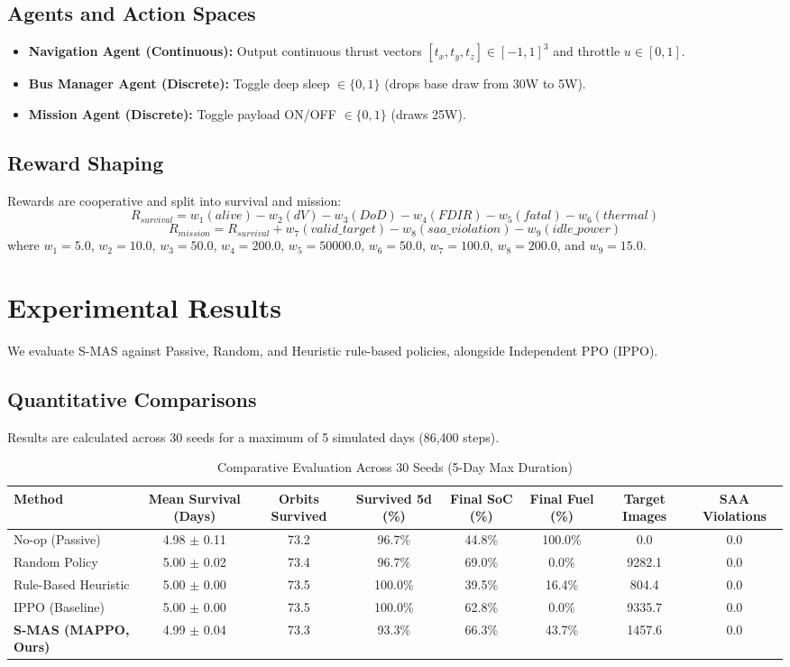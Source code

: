 \documentclass[conference]{IEEEtran}
\begin{document}
\subsection{Agents and Action Spaces}
\begin{itemize}
    \item \textbf{Navigation Agent (Continuous):} Output continuous thrust vectors $[t_x, t_y, t_z] \in [-1,1]^3$ and throttle $u \in [0,1]$.
    \item \textbf{Bus Manager Agent (Discrete):} Toggle deep sleep $\in \{0, 1\}$ (drops base draw from 30W to 5W).
    \item \textbf{Mission Agent (Discrete):} Toggle payload ON/OFF $\in \{0, 1\}$ (draws 25W).
\end{itemize}

\subsection{Reward Shaping}
Rewards are cooperative and split into survival and mission:
$$ R_{survival} = w_1(alive) - w_2(dV) - w_3(DoD) - w_4(FDIR) - w_5(fatal) - w_6(thermal) $$
$$ R_{mission} = R_{survival} + w_7(valid\_target) - w_8(saa\_violation) - w_9(idle\_power) $$
where $w_1=5.0$, $w_2=10.0$, $w_3=50.0$, $w_4=200.0$, $w_5=50000.0$, $w_6=50.0$, $w_7=100.0$, $w_8=200.0$, and $w_9=15.0$.

\section{Experimental Results}
We evaluate S-MAS against Passive, Random, and Heuristic rule-based policies, alongside Independent PPO (IPPO). 

\subsection{Quantitative Comparisons}
Results are calculated across 30 seeds for a maximum of 5 simulated days (86,400 steps).
\begin{table}[htbp]
\caption{Comparative Evaluation Across 30 Seeds (5-Day Max Duration)}
\label{tab:baselines}
\centering
\begin{tabular}{lccccccc}
\toprule
Method & Mean Survival (Days) & Orbits Survived & Survived 5d (\%) & Final SoC (\%) & Final Fuel (\%) & Target Images & SAA Violations \\
\midrule
No-op (Passive) & 4.98 $\pm$ 0.11 & 73.2 & 96.7\% & 44.8\% & 100.0\% & 0.0 & 0.0 \\
Random Policy & 5.00 $\pm$ 0.02 & 73.4 & 96.7\% & 69.0\% & 0.0\% & 9282.1 & 0.0 \\
Rule-Based Heuristic & 5.00 $\pm$ 0.00 & 73.5 & 100.0\% & 39.5\% & 16.4\% & 804.4 & 0.0 \\
IPPO (Baseline) & 5.00 $\pm$ 0.00 & 73.5 & 100.0\% & 62.8\% & 0.0\% & 9335.7 & 0.0 \\
\textbf{S-MAS (MAPPO, Ours)} & 4.99 $\pm$ 0.04 & 73.3 & 93.3\% & 66.3\% & 43.7\% & 1457.6 & 0.0 \\
\bottomrule
\end{tabular}
\end{table}
\end{document}
